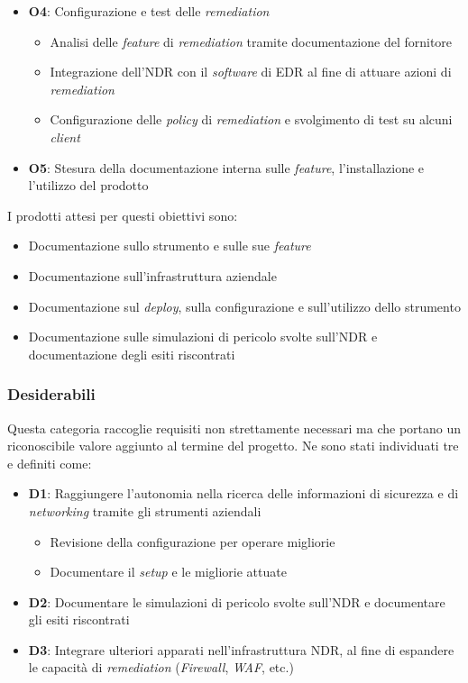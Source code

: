 \begin{itemize}
\begin{itemize}
    \end{itemize}
    \item \textbf{O4}: Configurazione e test delle \emph{remediation}
    \begin{itemize}
        \item Analisi delle \emph{feature} di \emph{remediation} tramite documentazione del fornitore
        \item Integrazione dell'NDR con il \emph{software} di EDR al fine di attuare azioni di \emph{remediation}
        \item Configurazione delle \emph{policy} di \emph{remediation} e svolgimento di test su alcuni \emph{client}
    \end{itemize}
    \item \textbf{O5}: Stesura della documentazione interna sulle \emph{feature}, l'installazione e l'utilizzo del prodotto
\end{itemize}

I prodotti attesi per questi obiettivi sono:

\begin{itemize}
    \item Documentazione sullo strumento e sulle sue \emph{feature}
    \item Documentazione sull'infrastruttura aziendale
    \item Documentazione sul \emph{deploy}, sulla configurazione e sull'utilizzo dello strumento
    \item Documentazione sulle simulazioni di pericolo svolte sull'NDR e documentazione degli esiti riscontrati
\end{itemize}

\subsubsection{Desiderabili}

Questa categoria raccoglie requisiti non strettamente necessari ma che portano un riconoscibile valore aggiunto al termine del progetto. Ne sono stati individuati tre e definiti come:

\begin{itemize}
    \item \textbf{D1}: Raggiungere l'autonomia nella ricerca delle informazioni di sicurezza e di \emph{networking} tramite gli strumenti aziendali
    \begin{itemize}
        \item Revisione della configurazione per operare migliorie
        \item Documentare il \emph{setup} e le migliorie attuate
    \end{itemize}
    \item \textbf{D2}: Documentare le simulazioni di pericolo svolte sull'NDR e documentare gli esiti riscontrati
    \item \textbf{D3}: Integrare ulteriori apparati nell'infrastruttura NDR, al fine di espandere le capacità di \emph{remediation} (\emph{Firewall}, \emph{WAF}, etc.)
\end{itemize}

